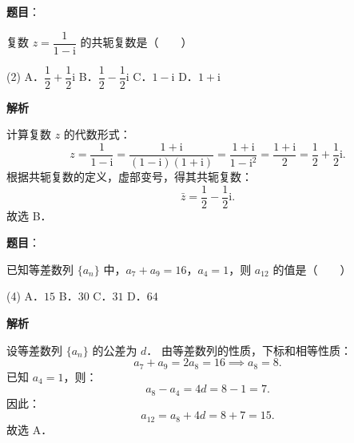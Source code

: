 

\begin{answer}

\textbf{题目}：

复数 $z = \dfrac{1}{1-\mathrm{i}}$ 的共轭复数是\mbox{（　　）}

\begin{gkopts}(2)
\task A．$\dfrac{1}{2} + \dfrac{1}{2}\mathrm{i}$
\task B．$\dfrac{1}{2} - \dfrac{1}{2}\mathrm{i}$
\task C．$1 - \mathrm{i}$
\task D．$1 + \mathrm{i}$
\end{gkopts}

\textbf{解析}

计算复数 $z$ 的代数形式：
\nopagebreak[4]
\[
z = \frac{1}{1-\mathrm{i}} = \frac{1+\mathrm{i}}{(1-\mathrm{i})(1+\mathrm{i})} = \frac{1+\mathrm{i}}{1 - \mathrm{i}^2} = \frac{1+\mathrm{i}}{2} = \frac{1}{2} + \frac{1}{2}\mathrm{i}.
\]
根据共轭复数的定义，虚部变号，得其共轭复数：
\nopagebreak[4]
\[
\bar{z} = \frac{1}{2} - \frac{1}{2}\mathrm{i}.
\]
故选 B．


\end{answer}
\begin{answer}

\textbf{题目}：

已知等差数列 $\{a_n\}$ 中，$a_7 + a_9 = 16$，$a_4 = 1$，则 $a_{12}$ 的值是\mbox{（　　）}

\begin{gkopts}(4)
\task A．$15$
\task B．$30$
\task C．$31$
\task D．$64$
\end{gkopts}

\textbf{解析}

设等差数列 $\{a_n\}$ 的公差为 $d$．
由等差数列的性质，下标和相等性质：
\nopagebreak[4]
\[
a_7 + a_9 = 2a_8 = 16 \implies a_8 = 8.
\]
已知 $a_4 = 1$，则：
\nopagebreak[4]
\[
a_8 - a_4 = 4d = 8 - 1 = 7.
\]
因此：
\nopagebreak[4]
\[
a_{12} = a_8 + 4d = 8 + 7 = 15.
\]
故选 A．


\end{answer}
